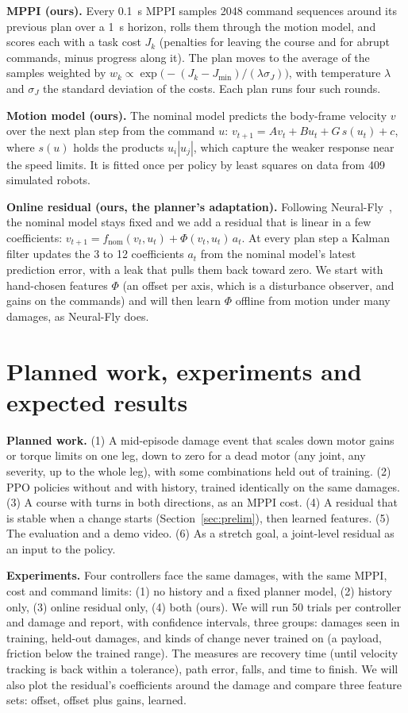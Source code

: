 \documentclass[10pt]{article}
\begin{document}
\textbf{MPPI (ours).} Every 0.1~s MPPI samples 2048 command sequences around
its previous plan over a 1~s horizon, rolls them through the motion model, and
scores each with a task cost $J_k$ (penalties for leaving the course and for
abrupt commands, minus progress along it). The plan moves to the average of
the samples weighted by
$w_k \propto \exp\bigl(-(J_k - J_{\min}) / (\lambda \sigma_J)\bigr)$, with
temperature $\lambda$ and $\sigma_J$ the standard deviation of the costs. Each
plan runs four such rounds.

\textbf{Motion model (ours).} The nominal model predicts the body-frame
velocity $v$ over the next plan step from the command $u$:
$v_{t+1} = A v_t + B u_t + G\, s(u_t) + c$, where $s(u)$ holds the products
$u_i |u_j|$, which capture the weaker response near the speed limits. It is
fitted once per policy by least squares on data from 409 simulated robots.

\textbf{Online residual (ours, the planner's adaptation).} Following
Neural-Fly~\cite{neuralfly}, the nominal model stays fixed and we add a
residual that is linear in a few coefficients:
$v_{t+1} = f_{\mathrm{nom}}(v_t, u_t) + \Phi(v_t, u_t)\, a_t$. At every plan
step a Kalman filter updates the 3 to 12 coefficients $a_t$ from the nominal
model's latest prediction error, with a leak that pulls them back toward zero.
We start with hand-chosen features $\Phi$ (an offset per axis, which is a
disturbance observer, and gains on the commands) and will then learn $\Phi$
offline from motion under many damages, as Neural-Fly does.

\section{Planned work, experiments and expected results}

\textbf{Planned work.} (1) A mid-episode damage event that scales down motor
gains or torque limits on one leg, down to zero for a dead motor (any joint,
any severity, up to the whole leg), with some combinations held out of
training. (2) PPO policies without and with history, trained identically on
the same damages. (3) A course with turns in both directions, as an MPPI cost.
(4) A residual that is stable when a change starts
(Section~\ref{sec:prelim}), then learned features. (5) The evaluation and a
demo video. (6) As a stretch goal, a joint-level residual as an input to the
policy.

\textbf{Experiments.} Four controllers face the same damages, with the same
MPPI, cost and command limits: (1) no history and a fixed planner model, (2)
history only, (3) online residual only, (4) both (ours). We will run 50 trials
per controller and damage and report, with confidence intervals, three groups:
damages seen in training, held-out damages, and kinds of change never trained
on (a payload, friction below the trained range). The measures are recovery
time (until velocity tracking is back within a tolerance), path error, falls,
and time to finish. We will also plot the residual's coefficients around the
damage and compare three feature sets: offset, offset plus gains, learned.
\end{document}
